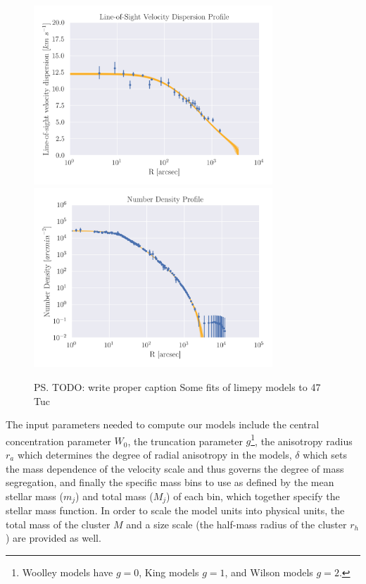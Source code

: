 \begin{figure}
	\centering
	\includegraphics[width=0.8\textwidth]{"./figures/limepy_veldisp.png"}
	\includegraphics[width=0.8\textwidth]{"./figures/limepy_numdens.png"}
	\label{fig:1/limepy_models}
	\caption{\ps{TODO: write proper caption} Some fits of limepy models to 47 Tuc}
\end{figure}


The input parameters needed to compute our models include the central concentration parameter $W_0$,
the truncation parameter $g$\footnote{Woolley models \citep{Woolley1954} have $g=0$, King models
	\citep{King1966} $g=1$, and Wilson models \citep{Wilson1975} $g=2$.}, the anisotropy radius $r_a$
which determines the degree of radial anisotropy in the models, $\delta$ which sets the mass
dependence of the velocity scale and thus governs the degree of mass segregation, and finally the
specific mass bins to use as defined by the mean stellar mass ($m_j$) and total mass ($M_j$) of each
bin, which together specify the stellar mass function. In order to scale the model units into
physical units, the total mass of the cluster $M$ and a size scale (the half-mass radius of the
cluster $r_h$) are provided as well.


